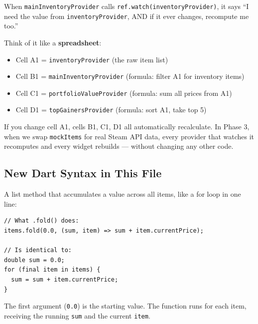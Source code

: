 \documentclass[11pt, a4paper]{article}
\begin{document}
\begin{conceptbox}[title=\textbf{ref.watch() --- The Dependency Chain}]
When \texttt{mainInventoryProvider} calls \texttt{ref.watch(inventoryProvider)}, it says ``I need the value from \texttt{inventoryProvider}, AND if it ever changes, recompute me too.''

Think of it like a \textbf{spreadsheet}:
\begin{itemize}
    \item Cell A1 = \texttt{inventoryProvider} (the raw item list)
    \item Cell B1 = \texttt{mainInventoryProvider} (formula: filter A1 for inventory items)
    \item Cell C1 = \texttt{portfolioValueProvider} (formula: sum all prices from A1)
    \item Cell D1 = \texttt{topGainersProvider} (formula: sort A1, take top 5)
\end{itemize}

If you change cell A1, cells B1, C1, D1 all automatically recalculate. In Phase 3, when we swap \texttt{mockItems} for real Steam API data, every provider that watches it recomputes and every widget rebuilds --- without changing any other code.
\end{conceptbox}

\subsection{New Dart Syntax in This File}

\begin{conceptbox}[title=\textbf{.fold() --- Accumulating a Value}]
A list method that accumulates a value across all items, like a for loop in one line:

\begin{lstlisting}[numbers=none]
// What .fold() does:
items.fold(0.0, (sum, item) => sum + item.currentPrice);

// Is identical to:
double sum = 0.0;
for (final item in items) {
  sum = sum + item.currentPrice;
}
\end{lstlisting}

The first argument (\texttt{0.0}) is the starting value. The function runs for each item, receiving the running \texttt{sum} and the current \texttt{item}.
\end{conceptbox}
\end{document}
